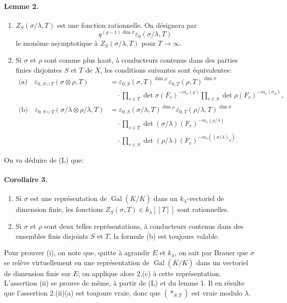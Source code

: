 \documentclass[11pt]{article}
\newcommand{\Gal}{\operatorname{Gal}}
\newcommand{\dimn}{\operatorname{dim}}
\newcommand{\eps}{\varepsilon}
\begin{document}
\paragraph{Lemme 2.}
\begin{enumerate}[label=(\roman*)]
\item $Z_S(\sigma/\lambda,T)$ est une fonction rationnelle. On désignera par
\[
 q^{(g-1)\dimn\sigma}\eps_0(\sigma/\lambda,T)
\]
le monôme asymptotique à $Z_S(\sigma/\lambda,T)$ pour $T\to\infty$.

\item Si $\sigma$ et $\rho$ sont comme plus haut, à conducteurs contenus dans des parties finies disjointes $S$ et $T$ de $X$, les conditions suivantes sont équivalentes:
\begin{align*}
\text{(a)}\quad
\eps_{0,S\cup T}(\sigma\otimes\rho,T)
&=\eps_{0,S}(\sigma,T)^{\dimn\rho}\,
  \eps_{0,T}(\rho,T)^{\dimn\sigma}\\
&\quad\cdot
\prod_{v\in T}\det\sigma(F_v)^{-m_v(\rho)}
\prod_{v\in S}\det\rho(F_v)^{-m_v(\sigma_S)},\\[0.5em]
\text{(b)}\quad
\eps_{0,S\cup T}(\sigma/\lambda\otimes\rho/\lambda,T)
&=\eps_{0,S}(\sigma/\lambda,T)^{\dimn\rho}\,
  \eps_{0,T}(\rho/\lambda,T)^{\dimn\sigma}\\
&\quad\cdot
\prod_{v\in T}\det(\sigma/\lambda)(F_v)^{-m_v(\rho/\lambda)}\\
&\quad\cdot
\prod_{v\in S}\det(\rho/\lambda)(F_v)^{-m_v((\sigma/\lambda)_S)} .
\end{align*}
\end{enumerate}

On va déduire de (L) que:

\paragraph{Corollaire 3.}
\begin{enumerate}[label=(\roman*)]
\item Si $\sigma$ est une représentation de $\Gal(\overline K/K)$ dans un $k_\lambda$-vectoriel de dimension finie, les fonctions $Z_S(\sigma,T)\in k_\lambda[[T]]$ sont rationnelles.
\item Si $\sigma$ et $\rho$ sont deux telles représentations, à conducteurs contenus dans des ensembles finis disjoints $S$ et $T$, la formule (b) est toujours valable.
\end{enumerate}

Pour prouver (i), on note que, quitte à agrandir $E$ et $k_\lambda$, on sait par Brauer que $\sigma$ se relève virtuellement en une représentation de $\Gal(\overline K/K)$ dans un vectoriel de dimension finie sur $E$; on applique alors 2.(c) à cette représentation. L'assertion (ii) se prouve de même, à partir de (L) et du lemme 1. Il en résulte que l'assertion 2.(ii)(a) est toujours vraie, donc que $(*_{S,T})$ est vraie modulo $\lambda$.
\end{document}
